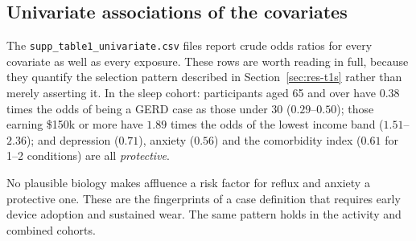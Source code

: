 \documentclass[11pt]{article}
\newcommand{\code}[1]{\texttt{\small #1}}
\begin{document}
\subsection{Univariate associations of the covariates}
\label{sec:res-cov}
The \code{supp_table1_univariate.csv} files report crude odds ratios for every covariate as well as
every exposure. These rows are worth reading in full, because they quantify the selection pattern
described in Section~\ref{sec:res-t1s} rather than merely asserting it. In the sleep cohort:
participants aged 65 and over have $0.38$ times the odds of being a GERD case as those under 30
($0.29$--$0.50$); those earning \$150k or more have $1.89$ times the odds of the lowest income band
($1.51$--$2.36$); and depression ($0.71$), anxiety ($0.56$) and the comorbidity index ($0.61$ for
1--2 conditions) are all \emph{protective}.

No plausible biology makes affluence a risk factor for reflux and anxiety a protective one. These
are the fingerprints of a case definition that requires early device adoption and sustained wear.
The same pattern holds in the activity and combined cohorts.
\end{document}
